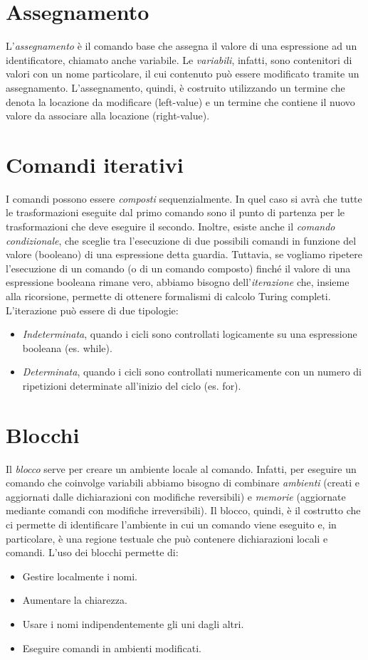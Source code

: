 \documentclass[a4paper,oneside,titlepage]{book}
\begin{document}
\section{Assegnamento}
L'\textit{assegnamento} è il comando base che assegna il valore di una espressione ad un identificatore, chiamato anche variabile. Le \textit{variabili}, infatti, sono contenitori di valori con un nome particolare, il cui contenuto può essere modificato tramite un assegnamento. L'assegnamento, quindi, è costruito utilizzando un termine che denota la locazione da modificare (left-value) e un termine che contiene il nuovo valore da associare alla locazione (right-value).

\section{Comandi iterativi}
I comandi possono essere \textit{composti} sequenzialmente. In quel caso si avrà che tutte le trasformazioni eseguite dal primo comando sono il punto di partenza per le trasformazioni che deve eseguire il secondo. Inoltre, esiste anche il \textit{comando condizionale}, che sceglie tra l'esecuzione di due possibili comandi in funzione del valore (booleano) di una espressione detta guardia. Tuttavia, se vogliamo ripetere l'esecuzione di un comando (o di un comando composto) finché il valore di una espressione booleana rimane vero, abbiamo bisogno dell'\textit{iterazione} che, insieme alla ricorsione, permette di ottenere formalismi di calcolo Turing completi. L'iterazione può essere di due tipologie:
\begin{itemize}
	\item \textit{Indeterminata}, quando i cicli sono controllati logicamente su una espressione booleana (es. while).
	\item \textit{Determinata}, quando i cicli sono controllati numericamente con un numero di ripetizioni determinate all'inizio del ciclo (es. for).
\end{itemize}

\section{Blocchi}
Il \textit{blocco} serve per creare un ambiente locale al comando. Infatti, per eseguire un comando che coinvolge variabili abbiamo bisogno di combinare \textit{ambienti} (creati e aggiornati dalle dichiarazioni con modifiche reversibili) e \textit{memorie} (aggiornate mediante comandi con modifiche irreversibili). Il blocco, quindi, è il costrutto che ci permette di identificare l'ambiente in cui un comando viene eseguito e, in particolare, è una regione testuale che può contenere dichiarazioni locali e comandi. L'uso dei blocchi permette di:
\begin{itemize}
	\item Gestire localmente i nomi.
	\item Aumentare la chiarezza.
	\item Usare i nomi indipendentemente gli uni dagli altri.
	\item Eseguire comandi in ambienti modificati.
\end{itemize}
\end{document}

